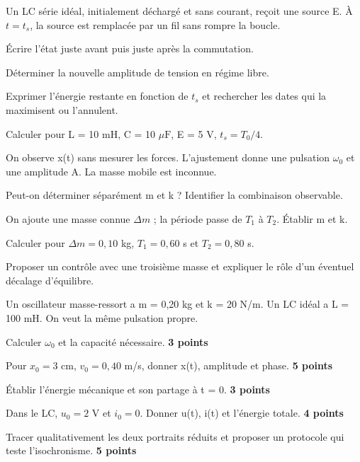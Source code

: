 \label{ch04-ex-D2}
Un LC série idéal, initialement déchargé et sans courant, reçoit une source E. À $t=t_s$, la source est remplacée par un fil sans rompre la boucle.\begin{questions}
\item Écrire l’état juste avant puis juste après la commutation.
\item Déterminer la nouvelle amplitude de tension en régime libre.
\item Exprimer l’énergie restante en fonction de $t_s$ et rechercher les dates qui la maximisent ou l’annulent.
\item Calculer pour L = 10 mH, C = 10 $\mu\mathrm{ F}$, E = 5 V, $t_s=T_0/4$.
\end{questions}


\label{ch04-ex-D3}
On observe x(t) sans mesurer les forces. L’ajustement donne une pulsation $\omega_0$ et une amplitude A. La masse mobile est inconnue.\begin{questions}
\item Peut-on déterminer séparément m et k ? Identifier la combinaison observable.
\item On ajoute une masse connue $\Delta m$ ; la période passe de $T_1$ à $T_2$. Établir m et k.
\item Calculer pour $\Delta m=0{,}10$ kg, $T_1=0{,}60$ s et $T_2=0{,}80$ s.
\item Proposer un contrôle avec une troisième masse et expliquer le rôle d’un éventuel décalage d’équilibre.
\end{questions}


Un oscillateur masse-ressort a m = 0,20 kg et k = 20 N/m. Un LC idéal a L = 100 mH. On veut la même pulsation propre.\begin{questions}
\item Calculer $\omega_0$ et la capacité nécessaire. \textbf{3 points}
\item Pour $x_0=3$ cm, $v_0=0{,}40$ m/s, donner x(t), amplitude et phase. \textbf{5 points}
\item Établir l’énergie mécanique et son partage à t = 0. \textbf{3 points}
\item Dans le LC, $u_0=2$ V et $i_0=0$. Donner u(t), i(t) et l’énergie totale. \textbf{4 points}
\item Tracer qualitativement les deux portraits réduits et proposer un protocole qui teste l’isochronisme. \textbf{5 points}
\end{questions}



